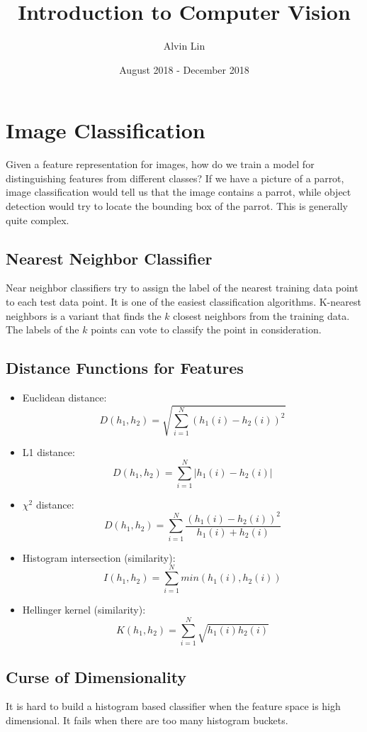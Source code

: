 \documentclass{math}
\title{Introduction to Computer Vision}
\author{Alvin Lin}
\date{August 2018 - December 2018}
\begin{document}
\maketitle

\section*{Image Classification}
Given a feature representation for images, how do we train a model for
distinguishing features from different classes? If we have a picture of a
parrot, image classification would tell us that the image contains a parrot,
while object detection would try to locate the bounding box of the parrot.
This is generally quite complex.

\subsection*{Nearest Neighbor Classifier}
Near neighbor classifiers try to assign the label of the nearest training data
point to each test data point. It is one of the easiest classification
algorithms. K-nearest neighbors is a variant that finds the \( k \) closest
neighbors from the training data. The labels of the \( k \) points can vote
to classify the point in consideration.

\subsection*{Distance Functions for Features}
\begin{itemize}
  \item Euclidean distance:
  \[ D(h_1,h_2) = \sqrt{\sum_{i=1}^{N}(h_1(i)-h_2(i))^2} \]
  \item L1 distance:
  \[ D(h_1,h_2) = \sum_{i=1}^{N}\bigg|h_1(i)-h_2(i)\bigg| \]
  \item \( \chi^2 \) distance:
  \[ D(h_1,h_2) = \sum_{i=1}^{N}\frac{(h_1(i)-h_2(i))^2}{h_1(i)+h_2(i)} \]
  \item Histogram intersection (similarity):
  \[ I(h_1,h_2) = \sum_{i=1}^{N}min(h_1(i),h_2(i)) \]
  \item Hellinger kernel (similarity):
  \[ K(h_1,h_2) = \sum_{i=1}^{N}\sqrt{h_1(i)h_2(i)} \]
\end{itemize}

\subsection*{Curse of Dimensionality}
It is hard to build a histogram based classifier when the feature space is
high dimensional. It fails when there are too many histogram buckets.
\end{document}
